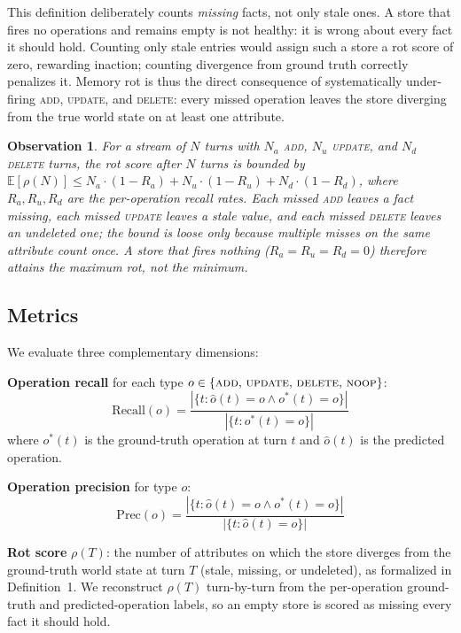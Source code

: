 \documentclass[10pt, twocolumn]{article}
\newtheorem{observation}{Observation}
\begin{document}
This definition deliberately counts \emph{missing} facts, not only stale
ones. A store that fires no operations and remains empty is not healthy: it
is wrong about every fact it should hold. Counting only stale entries would
assign such a store a rot score of zero, rewarding inaction; counting
divergence from ground truth correctly penalizes it.
Memory rot is thus the direct consequence of systematically under-firing
\textsc{add}, \textsc{update}, and \textsc{delete}: every missed operation
leaves the store diverging from the true world state on at least one
attribute.

\begin{observation}
For a stream of $N$ turns with $N_a$ \textsc{add}, $N_u$ \textsc{update},
and $N_d$ \textsc{delete} turns, the rot score after $N$ turns is bounded by
$\mathbb{E}[\rho(N)] \leq N_a \cdot (1 - R_a) + N_u \cdot (1 - R_u)
+ N_d \cdot (1 - R_d)$,
where $R_a, R_u, R_d$ are the per-operation recall rates.
Each missed \textsc{add} leaves a fact missing, each missed \textsc{update}
leaves a stale value, and each missed \textsc{delete} leaves an undeleted
one; the bound is loose only because multiple misses on the same attribute
count once.
A store that fires nothing ($R_a = R_u = R_d = 0$) therefore attains the
maximum rot, not the minimum.
\end{observation}

\subsection{Metrics}

We evaluate three complementary dimensions:

\textbf{Operation recall} for each type
$o \in \{\textsc{add},\,\textsc{update},\,\textsc{delete},\,\textsc{noop}\}$:
\[
  \text{Recall}(o) = \frac{|\{t : \hat{o}(t) = o \land o^*(t) = o\}|}{|\{t : o^*(t) = o\}|}
\]
where $o^*(t)$ is the ground-truth operation at turn $t$ and $\hat{o}(t)$
is the predicted operation.

\textbf{Operation precision} for type $o$:
\[
  \text{Prec}(o) = \frac{|\{t : \hat{o}(t) = o \land o^*(t) = o\}|}{|\{t : \hat{o}(t) = o\}|}
\]

\textbf{Rot score} $\rho(T)$: the number of attributes on which the store
diverges from the ground-truth world state at turn $T$ (stale, missing, or
undeleted), as formalized in Definition~1.
We reconstruct $\rho(T)$ turn-by-turn from the per-operation ground-truth
and predicted-operation labels, so an empty store is scored as missing every
fact it should hold.
\end{document}
